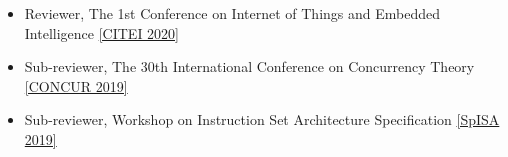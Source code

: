 \documentclass[9pt]{article}
\newenvironment{changemargin}[2]{%
  \begin{list}{}{%
    \setlength{\topsep}{0pt}%
    \setlength{\leftmargin}{#1}%
    \setlength{\rightmargin}{#2}%
    \setlength{\listparindent}{\parindent}%
    \setlength{\itemindent}{\parindent}%
    \setlength{\parsep}{\parskip}%
  }%
  \item[]}{\end{list}
}
\newenvironment{body} {
	\vspace*{-16pt}
	\begin{changemargin}{-0.25in}{-0.5in}
  }	
	{\end{changemargin}
}
\begin{document}
\begin{body}
	\begin{itemize} \itemsep 3pt
          \item Reviewer, The 1st Conference on Internet of Things and Embedded Intelligence \href{http://citei.intconference.org/}{[CITEI 2020]}
          \item Sub-reviewer, The 30th International Conference on Concurrency Theory \href{https://event.cwi.nl/concur2019/}{[CONCUR 2019]}
          \item Sub-reviewer, Workshop on Instruction Set Architecture Specification \href{https://www.cl.cam.ac.uk/~jrh13/spisa19.html}{[SpISA 2019]}
	\end{itemize}
\end{body}

\smallskip

\end{document}
